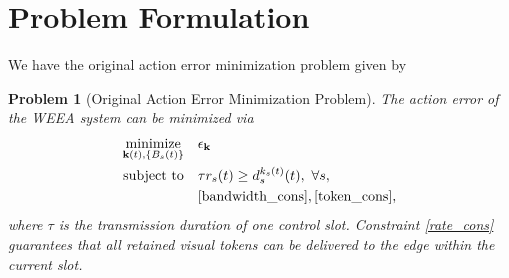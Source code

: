 \documentclass[lettersize,journal]{IEEEtran}
\theoremstyle{custom}
\newtheorem{Prob}{Problem}
\begin{document}


\section{Problem Formulation}
We have the original action error minimization problem given by
\begin{Prob}[Original Action Error Minimization Problem]\label{prob:p1}
    The action error of the WEEA system can be minimized via
    \begin{align}
        \underset{{\bf k}(t),\{B_s(t)\}}{\textrm{minimize}} \quad & \epsilon_{\bf k} \nonumber\\
        \textrm{subject to} \quad
        & \tau r_s(t) \geq d_s^{k_s(t)}(t), \ \forall s, \label{rate_cons}\\
        & \eqref{bandwidth_cons}, \eqref{token_cons}, \nonumber
    \end{align}
    where $\tau$ is the transmission duration of one control slot. Constraint \eqref{rate_cons} guarantees that all retained visual tokens can be delivered to the edge within the current slot.
\end{Prob}
\end{document}

